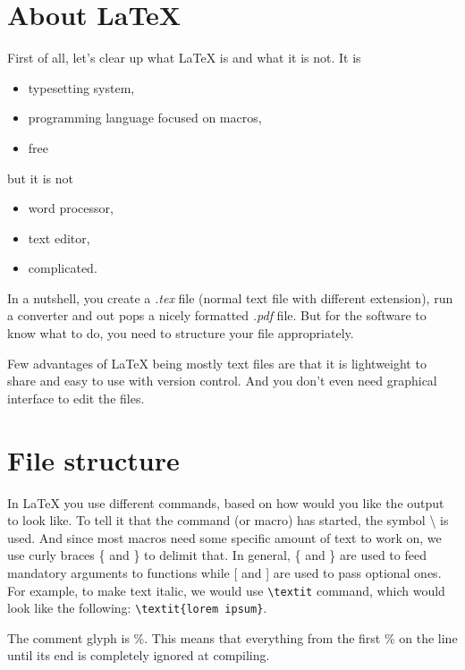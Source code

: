 \section{About \LaTeX}  %

First of all, let's clear up what \LaTeX{} is and what it is not. It is

\begin{itemize}
  \item typesetting system,
  \item programming language focused on macros,
  \item free
\end{itemize}

but it is not

\begin{itemize}
  \item word processor,
  \item text editor,
  \item complicated.
\end{itemize}

In a nutshell, you create a \textit{.tex} file (normal text file with different extension), run a converter and out pops a nicely formatted \textit{.pdf} file. But for the software to know what to do, you need to structure your file appropriately.

Few advantages of \LaTeX{} being mostly text files are that it is lightweight to share and easy to use with version control. And you don't even need graphical interface to edit the files.

\section{File structure}

In \LaTeX{} you use different commands, based on how would you like the output to look like. To tell it that the command (or macro) has started, the symbol \textbackslash{} is used. And since most macros need some specific amount of text to work on, we use curly braces \{ and \} to delimit that. In general, \{ and \} are used to feed mandatory arguments to functions while [ and ] are used to pass optional ones. For example, to make text italic, we would use \verb|\textit| command, which would look like the following: \verb|\textit{lorem ipsum}|.

The comment glyph is \%. This means that everything from the first \% on the line until its end is completely ignored at compiling.


